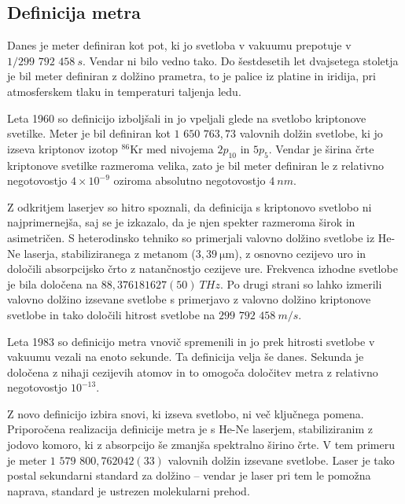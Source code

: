 \subsection*{Definicija metra}
Danes je meter definiran kot pot, ki jo svetloba v 
vakuumu prepotuje v 
$1/299\,\,792\,\,458~\si{s}$.  Vendar ni bilo vedno tako. Do šestdesetih let dvajsetega
stoletja je bil meter definiran z dolžino prametra, to je palice iz platine in iridija, 
pri atmosferskem tlaku in temperaturi taljenja ledu. 

Leta 1960 so definicijo 
izboljšali in jo vpeljali glede na svetlobo kriptonove svetilke. Meter je bil 
definiran kot $1\,\,650\,\,763,73$ valovnih dolžin svetlobe, ki jo izseva kriptonov
izotop $^{86}$Kr med nivojema $2p_{10}$ in $5p_5$. Vendar je širina črte
kriptonove svetilke razmeroma velika, zato je bil meter 
definiran le z relativno negotovostjo $4 \times 10^{-9}$ oziroma absolutno 
negotovostjo $4~\si{nm}$. 

Z odkritjem laserjev so hitro spoznali, da definicija s kriptonovo svetlobo ni 
najprimernejša, saj se je izkazalo, da je njen spekter razmeroma širok in asimetričen. 
S heterodinsko tehniko so primerjali valovno dolžino 
svetlobe 
iz He-Ne laserja, stabiliziranega z metanom ($3,39~\si{\micro\meter}$), z osnovno
cezijevo uro in določili absorpcijsko črto z natančnostjo cezijeve ure.
Frekvenca izhodne svetlobe je bila določena na $88,376181627(50)~\si{THz}$.
Po drugi strani so lahko izmerili valovno dolžino izsevane svetlobe s primerjavo 
z valovno dolžino kriptonove svetlobe in tako določili hitrost svetlobe na
$299\,\,792\,\, 458~\si{m/s}$.

Leta 1983 so definicijo metra vnovič spremenili in jo prek hitrosti svetlobe v
vakuumu vezali na enoto sekunde. Ta definicija velja še danes. Sekunda je določena
z nihaji cezijevih atomov in to omogoča določitev metra z relativno 
negotovostjo $10^{-13}$. 

Z novo definicijo izbira snovi, ki izseva svetlobo, ni več ključnega
pomena. Priporočena realizacija definicije metra je s He-Ne laserjem, 
stabiliziranim z jodovo komoro, ki z absorpcijo še zmanjša spektralno širino črte.
V tem primeru je meter $1\,\,579\,\,800,762042(33)$ valovnih dolžin izsevane svetlobe. 
Laser je tako postal sekundarni standard za dolžino -- vendar je laser pri tem le pomožna naprava, standard je ustrezen molekularni prehod. 

